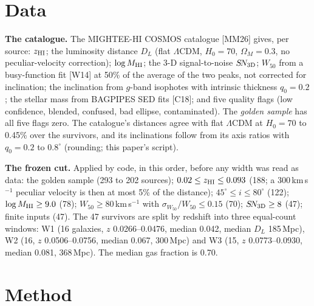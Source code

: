 \documentclass[10pt]{article}
\begin{document}
\section{Data}\label{sec:data}

\textbf{The catalogue.} The MIGHTEE-HI COSMOS catalogue [MM26] gives, per source: $z_{\rm HI}$; the luminosity distance $D_L$ (flat $\Lambda$CDM, $H_0=70$, $\Omega_M=0.3$, no peculiar-velocity correction); $\log M_{\rm HI}$; the 3-D signal-to-noise $S\!N_{\rm 3D}$; $W_{50}$ from a busy-function fit [W14] at 50\% of the average of the two peaks, not corrected for inclination; the inclination from $g$-band isophotes with intrinsic thickness $q_0=0.2$; the stellar mass from BAGPIPES SED fits [C18]; and five quality flags (low confidence, blended, confused, bad ellipse, contaminated). The \emph{golden sample} has all five flags zero. The catalogue's distances agree with flat $\Lambda$CDM at $H_0=70$ to 0.45\% over the survivors, and its inclinations follow from its axis ratios with $q_0=0.2$ to $0.8^\circ$ (rounding; this paper's script).

\textbf{The frozen cut.} Applied by code, in this order, before any width was read as data: the golden sample (293 to 202 sources); $0.02\le z_{\rm HI}\le0.093$ (188; a 300\,km\,s$^{-1}$ peculiar velocity is then at most 5\% of the distance); $45^\circ\le i\le80^\circ$ (122); $\log M_{\rm HI}\ge9.0$ (78); $W_{50}\ge80$\,km\,s$^{-1}$ with $\sigma_{W_{50}}/W_{50}\le0.15$ (70); $S\!N_{\rm 3D}\ge8$ (47); finite inputs (47). The 47 survivors are split by redshift into three equal-count windows: W1 (16 galaxies, $z$ 0.0266--0.0476, median 0.042, median $D_L$ 185\,Mpc), W2 (16, $z$ 0.0506--0.0756, median 0.067, 300\,Mpc) and W3 (15, $z$ 0.0773--0.0930, median 0.081, 368\,Mpc). The median gas fraction is 0.70.

\section{Method}\label{sec:method}
\end{document}
